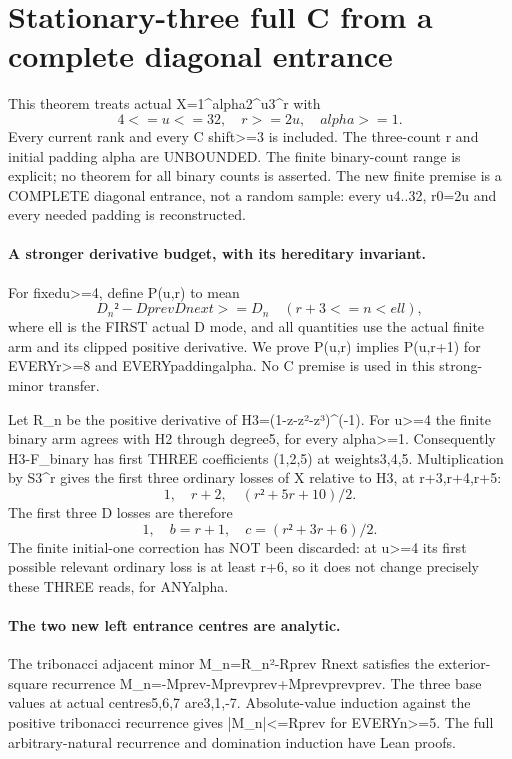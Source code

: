 \section{Stationary-three full C from a complete diagonal entrance}
This theorem treats actual X=1^alpha2^u3^r with
\[
                      4<=u<=32,\quad r>=2u,\quad alpha>=1.
\]
Every current rank and every C shift>=3 is included. The three-count
r and initial padding alpha are UNBOUNDED. The finite binary-count
range is explicit; no theorem for all binary counts is asserted.
The new finite premise is a COMPLETE diagonal entrance, not a random
sample: every u4..32, r0=2u and every needed padding is reconstructed.

\paragraph{A stronger derivative budget, with its hereditary invariant.}
For fixedu>=4, define P(u,r) to mean
\[
 D_n²-Dprev Dnext>=D_n\quad(r+3<=n<ell),                 \tag{1}
\]
where ell is the FIRST actual D mode, and all quantities use the
actual finite arm and its clipped positive derivative. We prove
P(u,r) implies P(u,r+1) for EVERYr>=8 and EVERYpaddingalpha.
No C premise is used in this strong-minor transfer.

Let R_n be the positive derivative of H3=(1-z-z²-z³)^(-1).
For u>=4 the finite binary arm agrees with H2 through degree5,
for every alpha>=1. Consequently H3-F_binary has first THREE
coefficients (1,2,5) at weights3,4,5. Multiplication by S3^r gives
the first three ordinary losses of X relative to H3, at r+3,r+4,r+5:
\[
                       1,\quad r+2,\quad(r²+5r+10)/2.
\]
The first three D losses are therefore
\[
                       1,\quad b=r+1,\quad c=(r²+3r+6)/2. \tag{2}
\]
The finite initial-one correction has NOT been discarded: at u>=4
its first possible relevant ordinary loss is at least r+6, so it
does not change precisely these THREE reads, for ANYalpha.

\paragraph{The two new left entrance centres are analytic.}
The tribonacci adjacent minor M_n=R_n²-Rprev Rnext satisfies the
exterior-square recurrence M_n=-Mprev-Mprevprev+Mprevprevprev.
The three base values at actual centres5,6,7 are3,1,-7.
Absolute-value induction against the positive tribonacci recurrence
gives |M_n|<=Rprev for EVERYn>=5. The full arbitrary-natural
recurrence and domination induction have Lean proofs.

